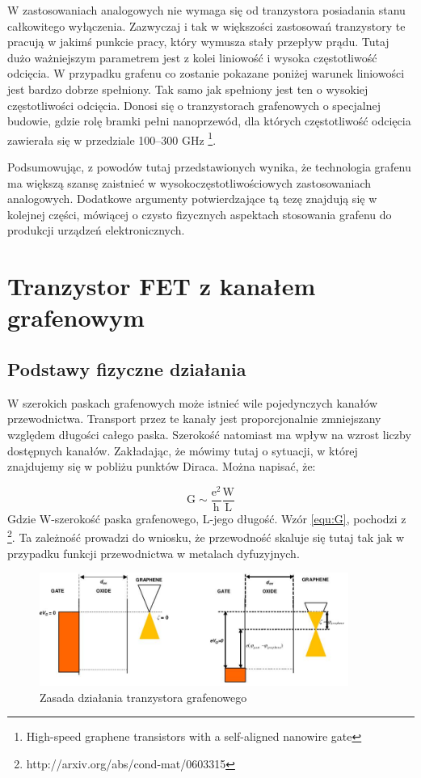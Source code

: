W zastosowaniach analogowych nie wymaga się od tranzystora posiadania stanu całkowitego wyłączenia. Zazwyczaj i tak 
w większości zastosowań tranzystory te pracują w jakimś punkcie pracy, który wymusza stały przepływ prądu. Tutaj dużo 
ważniejszym parametrem jest z kolei liniowość i wysoka częstotliwość odcięcia. W przypadku grafenu co zostanie pokazane
poniżej warunek liniowości jest bardzo dobrze spełniony. Tak samo jak spełniony jest ten o wysokiej częstotliwości odcięcia.
Donosi się o tranzystorach grafenowych o specjalnej budowie, gdzie rolę bramki pełni nanoprzewód, dla których
częstotliwość odcięcia zawierała się w przedziale 100--300 GHz \footnote{High-speed graphene transistors with a self-aligned nanowire gate}.



Podsumowując, z powodów tutaj przedstawionych wynika, że technologia grafenu ma większą szansę zaistnieć 
w wysokoczęstotliwościowych zastosowaniach analogowych. Dodatkowe argumenty potwierdzające tą tezę znajdują się 
w kolejnej części, mówiącej o czysto fizycznych aspektach stosowania grafenu do produkcji urządzeń elektronicznych.

	\section{Tranzystor FET z kanałem grafenowym}
		\subsection{Podstawy fizyczne działania}	
	W szerokich paskach grafenowych może istnieć wile pojedynczych kanałów przewodnictwa. Transport przez te kanały
	jest proporcjonalnie zmniejszany względem długości całego paska. Szerokość natomiast ma wpływ na wzrost liczby
	dostępnych kanałów. Zakładając, że mówimy tutaj o sytuacji, w której znajdujemy się w pobliżu punktów Diraca.
	Można napisać, że:

	\begin{equation}
    		\mathrm{ G \sim \frac{e^2}{h}\frac{W}{L} }
		\label{equ:G}
	\end{equation}
	Gdzie W-szerokość paska grafenowego, L-jego długość. Wzór \ref{equ:G}, pochodzi z \footnote{http://arxiv.org/abs/cond-mat/0603315}.
	Ta zależność prowadzi do wniosku, że przewodność skaluje się tutaj tak jak w przypadku funkcji przewodnictwa w 
	metalach dyfuzyjnych. 


		\begin{figure}[ht]
	\centering
	\includegraphics[width=0.90\textwidth]{./Rozdzial_3/obrazki/zasadadzialania.jpg}
	\caption{Zasada działania tranzystora grafenowego}
	\label{fig:MOSFET_dzialanie}
	\end{figure}

